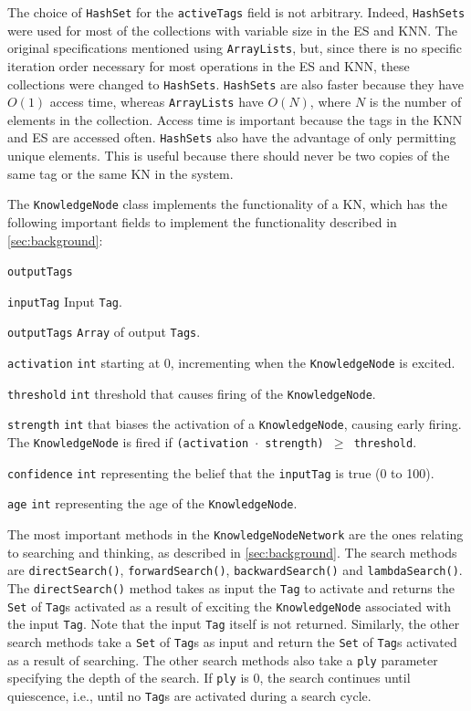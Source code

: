 \documentclass[titlepage,11pt]{article}
\newcommand{\code}[1]{\texttt{#1}}
\begin{document}
The choice of \code{HashSet} for the \code{activeTags} field is not arbitrary. Indeed, \code{HashSets} were used for most of the collections with variable size in the ES and KNN. The original specifications mentioned using \code{ArrayLists}, but, since there is no specific iteration order necessary for most operations in the ES and KNN, these collections were changed to \code{HashSets}. \code{HashSets} are also faster because they have $O(1)$ access time, whereas \code{ArrayLists} have $O(N)$, where $N$ is the number of elements in the collection. Access time is important because the tags in the KNN and ES are accessed often. \code{HashSets} also have the advantage of only permitting unique elements. This is useful because there should never be two copies of the same tag or the same KN in the system.

The \code{KnowledgeNode} class implements the functionality of a KN, which has the following important fields to implement the functionality described in \autoref{sec:background}:

\begin{labeling}{\code{outputTags}}
	\item[\code{inputTag}] Input \code{Tag}.
	\item[\code{outputTags}] \code{Array} of output \code{Tags}.
	\item[\code{activation}] \code{int} starting at 0, incrementing when the \code{KnowledgeNode} is excited.
	\item[\code{threshold}] \code{int} threshold that causes firing of the \code{KnowledgeNode}.
	\item[\code{strength}] \code{int} that biases the activation of a \code{KnowledgeNode}, causing early firing. The \code{KnowledgeNode} is fired if \code{(activation $\cdot$ strength) $\geq$ threshold}.
	\item[\code{confidence}] \code{int} representing the belief that the \code{inputTag} is true (0 to 100).
	\item[\code{age}] \code{int} representing the age of the \code{KnowledgeNode}.
\end{labeling}

The most important methods in the \code{KnowledgeNodeNetwork} are the ones relating to searching and thinking, as described in \cref{sec:background}. The search methods are \code{directSearch()}, \code{forwardSearch()}, \code{backwardSearch()} and \code{lambdaSearch()}. The \code{directSearch()} method takes as input the \code{Tag} to activate and returns the \code{Set} of \code{Tag}s activated as a result of exciting the \code{KnowledgeNode} associated with the input \code{Tag}. Note that the input \code{Tag} itself is not returned.
Similarly, the other search methods take a \code{Set} of \code{Tag}s as input and return the \code{Set} of \code{Tag}s activated as a result of searching. The other search methods also take a \code{ply} parameter specifying the depth of the search. If \code{ply} is 0, the search continues until quiescence, i.e., until no \code{Tag}s are activated during a search cycle.
\end{document}
